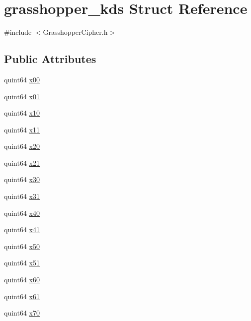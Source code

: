 \hypertarget{structgrasshopper__kds}{}\section{grasshopper\+\_\+kds Struct Reference}
\label{structgrasshopper__kds}


{\ttfamily \#include $<$Grasshopper\+Cipher.\+h$>$}

\subsection*{Public Attributes}
\begin{DoxyCompactItemize}
\item 
quint64 \hyperlink{structgrasshopper__kds_a324b5f8ea0724dd1cc1216b62ef65057}{x00}
\item 
quint64 \hyperlink{structgrasshopper__kds_a81c96865b2970acc72c5e829bbdb29ce}{x01}
\item 
quint64 \hyperlink{structgrasshopper__kds_a33907d8b365db74655dbab0a430d938d}{x10}
\item 
quint64 \hyperlink{structgrasshopper__kds_a6d4a32cdb266eb7513e0403d75a7fa40}{x11}
\item 
quint64 \hyperlink{structgrasshopper__kds_a4e196e0477afe815cf4b655618c478a9}{x20}
\item 
quint64 \hyperlink{structgrasshopper__kds_ade07e3145de67c1f8bb65271486391a1}{x21}
\item 
quint64 \hyperlink{structgrasshopper__kds_a45fbfa4e3b35447430c0808b3f9dbbfd}{x30}
\item 
quint64 \hyperlink{structgrasshopper__kds_a9e17d4851aaac6ce22807dd9be0bcdfd}{x31}
\item 
quint64 \hyperlink{structgrasshopper__kds_aef9bcd2ff66fd733d6bd4589e2913c61}{x40}
\item 
quint64 \hyperlink{structgrasshopper__kds_a3aaf0b8a4427bb1c0fff3a0da8fe877a}{x41}
\item 
quint64 \hyperlink{structgrasshopper__kds_a093735e04fc32f9a392bdcc969d7374a}{x50}
\item 
quint64 \hyperlink{structgrasshopper__kds_ad351467a4660d29ff241bc7535475b10}{x51}
\item 
quint64 \hyperlink{structgrasshopper__kds_a78c3589eabf21d18d029ac580f2ebf8f}{x60}
\item 
quint64 \hyperlink{structgrasshopper__kds_a6052a28c6ad1741674db84296ee5798d}{x61}
\item 
quint64 \hyperlink{structgrasshopper__kds_af99523e7d24d327ae111a6874bd5f071}{x70}

\end{DoxyCompactItemize}
